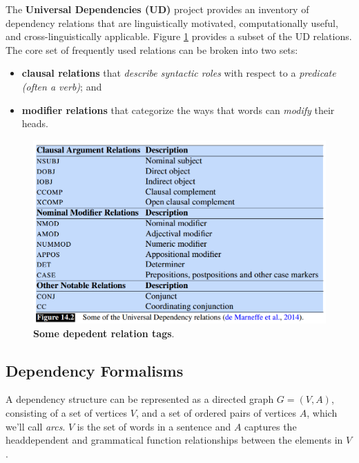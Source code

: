 \documentclass[11pt]{article}
\begin{document}
The \textbf{Universal Dependencies (UD)} project \citep{nivre2016universal} provides an inventory of dependency relations that are linguistically motivated, computationally useful, and cross-linguistically applicable. Figure \ref{fig: dep_relation} provides a subset of the UD relations. The core set of frequently used relations can be
broken into two sets: 
\begin{itemize}
\item \textbf{clausal relations} that \emph{describe syntactic roles} with respect to a \emph{predicate (often a verb)}; and
\item \textbf{modifier relations} that categorize the ways that words can \emph{modify} their heads.
\end{itemize}
  
\begin{figure}
\begin{minipage}[t]{1\linewidth}
  \centering
  \centerline{\includegraphics[scale = 0.3]{dep_relations.png}}
\end{minipage}
\caption{\footnotesize{\textbf{Some depedent relation tags}.}}
\label{fig: dep_relation}
\end{figure}

\subsection{Dependency Formalisms}
A dependency structure can be represented as a directed graph $G = (V,A)$, consisting of a set of vertices $V$, and a set of ordered pairs of vertices $A$, which we’ll call \emph{arcs}. $V$ is the set of words in a sentence and $A$ captures the headdependent and grammatical function relationships between the elements in $V$.
\end{document}
